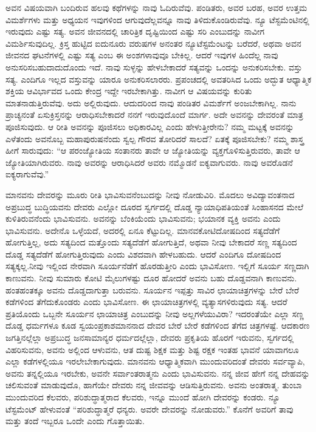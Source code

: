 ಅವನ ವಿಷಯವಾಗಿ ಬಂದಿರುವ ಹಲವು ಕಥೆಗಳನ್ನು ನಾವು ಓದಿರುವೆವು. ಪಂಡಿತರು, ಅವರ ಬರಹ, ಅವರ ಉತ್ತಮ ವಿಮರ್ಶೆಗಳು ಮತ್ತು ಅಧ್ಯಯನ ಇವುಗಳಿಂದ ಆಗುವುದೆಲ್ಲವನ್ನೂ ನಾವು ತಿಳಿದುಕೊಂಡಿರುವೆವು. ನ್ಯೂ ಟೆಸ್ಟಮೆಂಟಿನಲ್ಲಿ ಇರುವುದು ಎಷ್ಟು ಸತ್ಯ. ಅವನ ಜೀವನದಲ್ಲಿ ಚಾರಿತ್ರಿಕ ದೃಷ್ಟಿಯಿಂದ ಎಷ್ಟು ಸರಿ ಎಂಬುದನ್ನು ನಾವೀಗ ವಿಮರ್ಶಿಸುವುದಿಲ್ಲ. ಕ್ರಿಸ್ತ ಹುಟ್ಟಿದ ಐದುನೂರು ವರುಷಗಳ ಅನಂತರ ನ್ಯೂಟೆಸ್ಟಮೆಂಟನ್ನು ಬರೆದರೆ, ಅಥವಾ ಅವನ ಜೀವನದ ಘಟನೆಗಳಲ್ಲಿ ಎಷ್ಟು ಸತ್ಯ ಎಂಬ ಈ ಅಂಶಗಳಾವುವೂ ಬೇಕಿಲ್ಲ. ಆದರೆ ಇವುಗಳ ಹಿಂದೆಲ್ಲ ನಾವು ಅನುಸರಿಸಬಹುದಾದುದೊಂದು ಇದೆ. ನಾವು ಸುಳ್ಳನ್ನು ಹೇಳಬೇಕಾದರೆ ಸತ್ಯವನ್ನು ಒಂದನ್ನು ಅನುಕರಿಸಬೇಕು. ವಸ್ತು ಸತ್ಯ. ಎಂದಿಗೂ ಇಲ್ಲದ ವಸ್ತುವನ್ನು ಯಾರೂ ಅನುಕರಿಸಲಾರರು. ಪ್ರಪಂಚದಲ್ಲಿ ಅವತರಿಸಿದ ಒಂದು ಅದ್ಭುತ ಆಧ್ಯಾತ್ಮಿಕ ಶಕ್ತಿಯ ಆವಿರ್ಭಾವದ ಒಂದು ಕೇಂದ್ರ ಇದ್ದೇ ಇರಬೇಕಾಗಿತ್ತು. ನಾವೀಗ ಆ ವಿಷಯವನ್ನು ಕುರಿತು ಮಾತನಾಡುತ್ತಿರುವೆವು. ಅದು ಅಲ್ಲಿರುವುದು. ಆದುದರಿಂದ ನಾವು ಪಂಡಿತರ ವಿಮರ್ಶೆಗೆ ಅಂಜಬೇಕಾಗಿಲ್ಲ. ನಾನು ಪ್ರಾಚ್ಯನಂತೆ ಏಸುಕ್ರಿಸ್ತನನ್ನು ಆರಾಧಿಸಬೇಕಾದರೆ ನನಗೆ ಇರುವುದೊಂದೆ ಮಾರ್ಗ. ಅದೇ ಅವನನ್ನು ದೇವರಂತೆ ಮಾತ್ರ ಪೂಜಿಸುವುದು. ಆ ರೀತಿ ಅವನನ್ನು ಪೂಜಿಸಲು ಅಧಿಕಾರವಿಲ್ಲ ಎಂದು ಹೇಳುತ್ತೀರೇನು? ನಮ್ಮ ಮಟ್ಟಕ್ಕೆ ಅವನನ್ನು ಎಳೆತಂದು ಅವನೊಬ್ಬ ಮಹಾಪುರುಷನೆಂದು ಸ್ವಲ್ಪ ಗೌರವ ತೋರಿದರೆ ಸಾಲದೆ? ಏತಕ್ಕೆ ಪೂಜಿಸಬೇಕು? ನಮ್ಮ ಶಾಸ್ತ್ರ ಹೀಗೆ ಸಾರುವುದು: “ಆ ಪರಂಜ್ಯೋತಿಯ ಸಂತಾನರು ತಾವೇ ಆ ಜ್ಯೋತಿಯನ್ನು ವ್ಯಕ್ತಗೊಳಿಸುತ್ತಿರುವರು, ತಾವೇ ಆ ಜ್ಯೋತಿಯಾಗಿರುವರು. ನಾವು ಅವರನ್ನು ಆರಾಧಿಸಿದರೆ ಅವರು ನಮ್ಮೊಡನೆ ಐಕ್ಯವಾಗುವರು. ನಾವು ಅವರೊಡನೆ ಐಕ್ಯರಾಗುವೆವು.”

ಮಾನವನು ದೇವರನ್ನು ಮೂರು ರೀತಿ ಭಾವಿಸುವನೆಂಬುದನ್ನು ನೀವು ನೋಡುವಿರಿ. ಮೊದಲು ಅವಿದ್ಯಾವಂತನಾದ ಅಪ್ರಬುದ್ಧ ಬುದ್ಧಿಯವನು ದೇವರು ಎಲ್ಲೋ ದೂರದ ಸ್ವರ್ಗದಲ್ಲಿ ದೊಡ್ಡ ನ್ಯಾಯಾಧಿಪತಿಯಂತೆ ಸಿಂಹಾಸನದ ಮೇಲೆ ಕುಳಿತಿರುವನೆಂದು ಭಾವಿಸುವನು. ಅವನನ್ನು ಬೆಂಕಿಯೆಂದು ಭಾವಿಸುವನು; ಭಯಾನಕ ವ್ಯಕ್ತಿ ಅವನು ಎಂದು ಭಾವಿಸುವನು. ಅದೇನೊ ಒಳ್ಳೆಯದೆ, ಅದರಲ್ಲಿ ಏನೂ ಕೆಟ್ಟುದಿಲ್ಲ. ಮಾನವಕೋಟಿ\break ದೋಷದಿಂದ ಸತ್ಯದೆಡೆಗೆ ಹೋಗುತ್ತಿಲ್ಲ, ಅದು ಸತ್ಯದಿಂದ ಮತ್ತೊಂದು ಸತ್ಯದೆಡೆಗೆ ಹೋಗುತ್ತಿದೆ, ಅಥವಾ ನೀವು ಬೇಕಾದರೆ ಸಣ್ಣ ಸತ್ಯದಿಂದ ದೊಡ್ಡ ಸತ್ಯದೆಡೆಗೆ ಹೋಗುತ್ತಿರುವುದು ಎಂದು ವಿಶದವಾಗಿ ಹೇಳಬಹುದು. ಆದರೆ ಎಂದಿಗೂ ದೋಷದಿಂದ ಸತ್ಯಕ್ಕಲ್ಲ.\break ನೀವು ಇಲ್ಲಿಂದ ನೇರವಾಗಿ ಸೂರ್ಯನೆಡೆಗೆ ಹೊರಡುತ್ತೀರಿ ಎಂದು ಭಾವಿಸೋಣ. ಇಲ್ಲಿಗೆ ಸೂರ್ಯ ಸಣ್ಣದಾಗಿ ಕಾಣುವನು. ನೀವು ಸುಮಾರು ಕೋಟಿ ಮೈಲುಗಳಷ್ಟು ದೂರ ಹೋದರೆ ಅವನು ಬಹು ದೊಡ್ಡವನಾಗಿ ಕಾಣುವನು. ಹಂತಹಂತಕ್ಕೂ ಅವನು ದೊಡ್ಡದಾಗುತ್ತಾ ಬರುವನು. ಸೂರ್ಯನ ಇಪ್ಪತ್ತು ಸಾವಿರ ಛಾಯಾಚಿತ್ರಗಳನ್ನು ಬೇರೆ ಬೇರೆ ಕಡೆಗಳಿಂದ ತೆಗೆದು\-ಕೊಂಡರು ಎಂದು ಭಾವಿಸೋಣ. ಈ ಛಾಯಾಚಿತ್ರಗಳಲ್ಲಿ ವ್ಯತ್ಯಾಸಗಳಿರುವುದು ಸತ್ಯ. ಆದರೆ ಪ್ರತಿಯೊಂದು ಒಬ್ಬನೇ ಸೂರ್ಯನ ಛಾಯಾಚಿತ್ರ ಎಂಬುದನ್ನು ನೀವು ಅಲ್ಲಗಳೆಯು\-ವಿರಾ? ಇದರಂತೆಯೇ ಎಲ್ಲಾ ಸಣ್ಣ ದೊಡ್ಡ ಧರ್ಮಗಳೂ ಕೂಡ ಸ್ವಯಂಪ್ರಕಾಶಮಾನನಾದ ದೇವರ ಬೇರೆ ಬೇರೆ ಕಡೆಗಳಿಂದ ತೆಗೆದ ಚಿತ್ರಗಳಷ್ಟೆ. ಆದಕಾರಣ ಜಗತ್ತಿನಲ್ಲೆಲ್ಲಾ ಅಪ್ರಬುದ್ಧ ಜನಸಾಮಾನ್ಯರ ಧರ್ಮದಲ್ಲೆಲ್ಲಾ, ದೇವರು ಪ್ರಕೃತಿಯ ಹೊರಗೆ ಇರುವನು, ಸ್ವರ್ಗದಲ್ಲಿ ವಿಹರಿಸುವನು, ಅವನು ಅಲ್ಲಿಂದ ಆಳುವನು, ಆತ ದುಷ್ಟ ಶಿಕ್ಷಕ ಮತ್ತು ಶಿಷ್ಟ ರಕ್ಷಕ ಇಂತಹ ಭಾವನೆ ಯಾವಾಗಲೂ ಎಲ್ಲಾ ಕಡೆಗಳಲ್ಲಿಯೂ ಇರಲೇಬೇಕಾಗುವುದು. ಮಾನವನು ಆಧ್ಯಾತ್ಮಿಕವಾಗಿ ಮುಂದುವರಿದಂತೆ ದೇವರು ಸರ್ವವ್ಯಾಪಿ, ಅವನು ತನ್ನ\-ಲ್ಲಿಯೂ ಇರಬೇಕು, ಅವನೇ ಸರ್ವಾಂತರಾತ್ಮನು ಎಂದು ಭಾವಿಸುವನು. ನನ್ನ ಜೀವ ಹೇಗೆ ನನ್ನ ದೇಹವನ್ನು ಚಲಿಸುವಂತೆ ಮಾಡುವುದೊ, ಹಾಗೆಯೇ ದೇವರು ನನ್ನ ಜೀವವನ್ನು ಆಡಿಸುತ್ತಿರುವನು. ಅವನು ಅಂತರಾತ್ಮ. ತುಂಬಾ ಮುಂದುವರಿದ ಕೆಲವರು, ಪರಿಶುದ್ಧಾತ್ಮರಾದ ಕೆಲವರು, ಇನ್ನೂ ಮುಂದೆ ಹೋಗಿ ದೇವರನ್ನು ಕಂಡರು. ನ್ಯೂ ಟೆಸ್ಟಮೆಂಟ್​ ಹೇಳುವಂತೆ “ಪರಿಶುದ್ಧಾತ್ಮರೆ ಧನ್ಯರು. ಅವರೇ ದೇವರನ್ನು ನೋಡುವರು.” ಕೊನೆಗೆ ಅವರಿಗೆ ತಾವು ಮತ್ತು ತಂದೆ ಇಬ್ಬರೂ ಒಂದೇ ಎಂದು ಗೊತ್ತಾಯಿತು.

